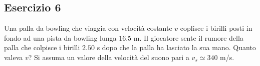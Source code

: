 \documentclass[12pt,a4paper]{book}
\begin{document}
\subsection*{Esercizio 6} 
Una palla da bowling che viaggia con velocità costante $v$ coplisce i birilli posti in fondo ad una pista da bowling lunga $16.5$ m. Il giocatore sente il rumore della palla che colpisce i birilli $2.50$ s dopo che la palla ha lasciato la sua mano. Quanto valeva $v$? Si assuma un valore della velocità del suono pari a $v_s\simeq340$ m/s.

\end{document}
